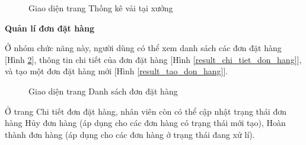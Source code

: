 \begin{figure}[H]
    \begin{center}
        \caption{Giao diện trang Thống kê vải tại xưởng}
        \label{result_ton_kho_xuong}
    \end{center}
\end{figure}

\textbf{Quản lí đơn đặt hàng}

Ở nhóm chức năng này, người dùng có thể xem danh sách các đơn đặt hàng [Hình \ref{result_danh_sach_don_hang}], thông tin chi tiết của đơn đặt hàng [Hình \ref{result_chi_tiet_don_hang}], và tạo một đơn đặt hàng mới [Hình \ref{result_tao_don_hang}]. \par

\begin{figure}[H]
    \begin{center}
        \caption{Giao diện trang Danh sách đơn đặt hàng}
        \label{result_danh_sach_don_hang}
    \end{center}
\end{figure}

Ở trang Chi tiết đơn đặt hàng, nhân viên còn có thể cập nhật trạng thái đơn hàng Hủy đơn hàng (áp dụng cho các đơn hàng có trạng thái mới tạo), Hoàn thành đơn hàng (áp dụng cho các đơn hàng ở trạng thái đang xử lí). \par

